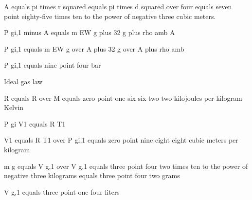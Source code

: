 A equals pi times r squared equals pi times d squared over four equals seven point eighty-five times ten to the power of negative three cubic meters.

P gi,1 minus A equals m EW g plus 32 g plus rho amb A

P gi,1 equals m EW g over A plus 32 g over A plus rho amb

P gi,1 equals nine point four bar

Ideal gas law

R equals R over M equals zero point one six six two two kilojoules per kilogram Kelvin

P gi V1 equals R T1

V1 equals R T1 over P gi,1 equals zero point nine eight eight cubic meters per kilogram

m g equals V g,1 over V g,1 equals three point four two times ten to the power of negative three kilograms equals three point four two grams

V g,1 equals three point one four liters